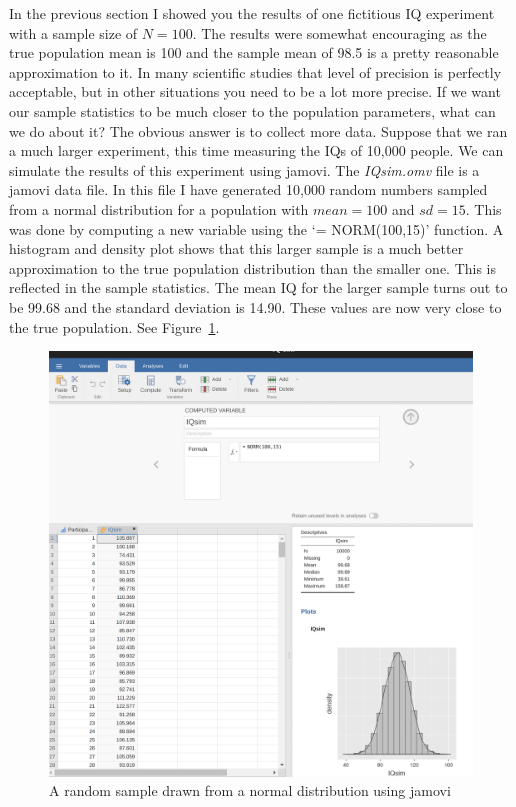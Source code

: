 \documentclass[
  a4paper,
]{book}
\begin{document}
In the previous section I showed you the results of one fictitious IQ
experiment with a sample size of \(N = 100\). The results were somewhat
encouraging as the true population mean is 100 and the sample mean of
98.5 is a pretty reasonable approximation to it. In many scientific
studies that level of precision is perfectly acceptable, but in other
situations you need to be a lot more precise. If we want our sample
statistics to be much closer to the population parameters, what can we
do about it? The obvious answer is to collect more data. Suppose that we
ran a much larger experiment, this time measuring the IQs of 10,000
people. We can simulate the results of this experiment using jamovi. The
\emph{IQsim.omv} file is a jamovi data file. In this file I have
generated 10,000 random numbers sampled from a normal distribution for a
population with \(mean = 100\) and \(sd = 15\). This was done by
computing a new variable using the `= NORM(100,15)' function. A
histogram and density plot shows that this larger sample is a much
better approximation to the true population distribution than the
smaller one. This is reflected in the sample statistics. The mean IQ for
the larger sample turns out to be 99.68 and the standard deviation is
14.90. These values are now very close to the true population. See
Figure~\ref{fig-fig8-5}.

\begin{figure}

\includegraphics[width=1\textwidth,height=\textheight]{images/fig8-5.png} \hfill{}

\caption{\label{fig-fig8-5}A random sample drawn from a normal
distribution using jamovi}

\end{figure}
\end{document}
